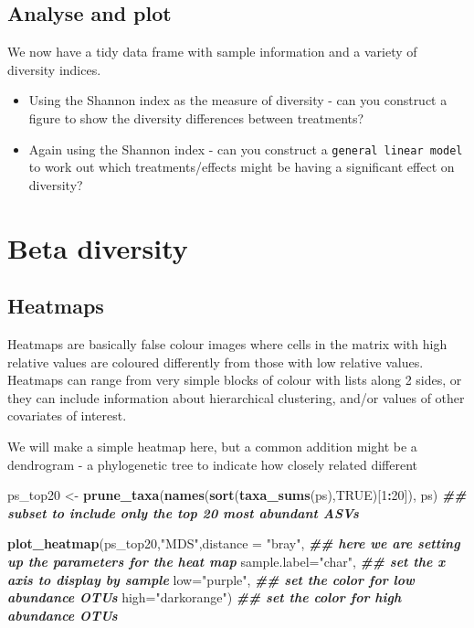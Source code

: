 \documentclass[
]{book}
\newenvironment{Shaded}{\begin{snugshade}}{\end{snugshade}}
\newcommand{\AttributeTok}[1]{\textcolor[rgb]{0.13,0.29,0.53}{#1}}
\newcommand{\ConstantTok}[1]{\textcolor[rgb]{0.56,0.35,0.01}{#1}}
\newcommand{\DecValTok}[1]{\textcolor[rgb]{0.00,0.00,0.81}{#1}}
\newcommand{\DocumentationTok}[1]{\textcolor[rgb]{0.56,0.35,0.01}{\textbf{\textit{#1}}}}
\newcommand{\FunctionTok}[1]{\textcolor[rgb]{0.13,0.29,0.53}{\textbf{#1}}}
\newcommand{\NormalTok}[1]{#1}
\newcommand{\OtherTok}[1]{\textcolor[rgb]{0.56,0.35,0.01}{#1}}
\newcommand{\SpecialCharTok}[1]{\textcolor[rgb]{0.81,0.36,0.00}{\textbf{#1}}}
\newcommand{\StringTok}[1]{\textcolor[rgb]{0.31,0.60,0.02}{#1}}
\begin{document}
\hypertarget{analyse-and-plot}{%
\subsection{Analyse and plot}\label{analyse-and-plot}}

We now have a tidy data frame with sample information and a variety of diversity indices.

\begin{itemize}
\item
  Using the Shannon index as the measure of diversity - can you construct a figure to show the diversity differences between treatments?
\item
  Again using the Shannon index - can you construct a \texttt{general\ linear\ model} to work out which treatments/effects might be having a significant effect on diversity?
\end{itemize}

\hypertarget{beta-diversity}{%
\section{Beta diversity}\label{beta-diversity}}

\hypertarget{heatmaps}{%
\subsection{Heatmaps}\label{heatmaps}}

Heatmaps are basically false colour images where cells in the matrix with high relative values are coloured differently from those with low relative values. Heatmaps can range from very simple blocks of colour with lists along 2 sides, or they can include information about hierarchical clustering, and/or values of other covariates of interest.

We will make a simple heatmap here, but a common addition might be a dendrogram - a phylogenetic tree to indicate how closely related different

\begin{Shaded}
\begin{Highlighting}[]
\NormalTok{ps\_top20 }\OtherTok{\textless{}{-}} \FunctionTok{prune\_taxa}\NormalTok{(}\FunctionTok{names}\NormalTok{(}\FunctionTok{sort}\NormalTok{(}\FunctionTok{taxa\_sums}\NormalTok{(ps),}\ConstantTok{TRUE}\NormalTok{)[}\DecValTok{1}\SpecialCharTok{:}\DecValTok{20}\NormalTok{]), ps) }\DocumentationTok{\#\# subset to include only the top 20 most abundant ASVs}

\FunctionTok{plot\_heatmap}\NormalTok{(ps\_top20,}\StringTok{"MDS"}\NormalTok{,}\AttributeTok{distance =} \StringTok{"bray"}\NormalTok{, }\DocumentationTok{\#\# here we are setting up the parameters for the heat map}
             \AttributeTok{sample.label=}\StringTok{"char"}\NormalTok{, }\DocumentationTok{\#\# set the x axis to display by sample}
             \AttributeTok{low=}\StringTok{"purple"}\NormalTok{,   }\DocumentationTok{\#\# set the color for low abundance OTUs}
             \AttributeTok{high=}\StringTok{"darkorange"}\NormalTok{) }\DocumentationTok{\#\# set the color for high abundance OTUs}
\end{Highlighting}
\end{Shaded}
\end{document}
